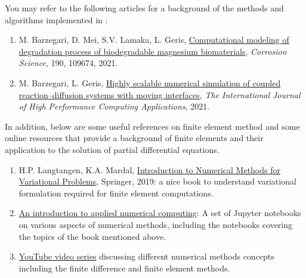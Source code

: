 You may refer to the following articles for a background of the methods and algorithms implemented in \biodeg:

\begin{enumerate}
\item
M. Barzegari, D. Mei, S.V. Lamaka, L. Geris, \href{https://doi.org/10.1016/j.corsci.2021.109674}{Computational modeling of degradation process of biodegradable magnesium biomaterials}, \emph{Corrosion Science}, 190, 109674, 2021.
\item
M. Barzegari, L. Geris, \href{https://doi.org/10.1177/10943420211045939}{Highly scalable numerical simulation of coupled reaction–diffusion systems with moving interfaces}, \emph{The International Journal of High Performance Computing Applications}, 2021.
\end{enumerate}

\noindent In addition, below are some useful references on finite element method and some online resources that provide a background of finite elements and their application to the solution of partial differential equations.

\begin{enumerate}
\item
H.P. Langtangen, K.A. Mardal, \href{https://link.springer.com/book/10.1007/978-3-030-23788-2}{Introduction to Numerical Methods for Variational Problems}, Springer, 2019: a nice book to understand variational formulation required for finite element computations.
\item
\href{https://github.com/TuxRiders/numerical-computing-intro}{An introduction to applied numerical computing}: A set of Jupyter notebooks on various aspects of numerical methods, including the notebooks covering the topics of the book mentioned above.
\item
\href{https://www.youtube.com/playlist?list=PL6fjYEpJFi7UMDXtNiaF3eLlOKAM8Lrkf}{YouTube video series} discussing different numerical methods concepts including the finite difference and finite element methods.
\end{enumerate}



